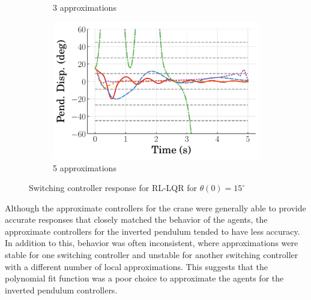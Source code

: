 \begin{figure}[tb]
\begin{subfigure}[b]{0.32\textwidth}
        \caption{3 approximations}
        \label{subfig_chap5:lumped_LQR_near_equil_15_3_bins_resp_unclipped}
    \end{subfigure}
    \hfill
    \begin{subfigure}[b]{0.32\textwidth}
        \centering
        \includegraphics[width=\textwidth]{figures/figures_Interpretability/Mean_ISE_Inverted_Pendulum-v0_cubic_5_bins_near_equil/Curve_fit_time_responses/lumped_LQR/curve_fit_Pend_Disp_15.pdf}
        \caption{5 approximations}
        \label{subfig_chap5:lumped_LQR_near_equil_15_5_bins_resp_unclipped}
    \end{subfigure}
    \caption{Switching controller response for RL-LQR for $\theta(0)=15^\circ$}
    \label{fig_chap5:lumped_LQR_near_equil_15_resp_unclipped}
\end{figure}
%

Although the approximate controllers for the crane were generally able to provide accurate responses that closely matched the behavior of the agents, the approximate controllers for the inverted pendulum tended to have less accuracy. In addition to this, behavior was often inconsistent, where approximations were stable for one switching controller and unstable for another switching controller with a different number of local approximations.
This suggests that the polynomial fit function was a poor choice to approximate the agents for the inverted pendulum controllers.



